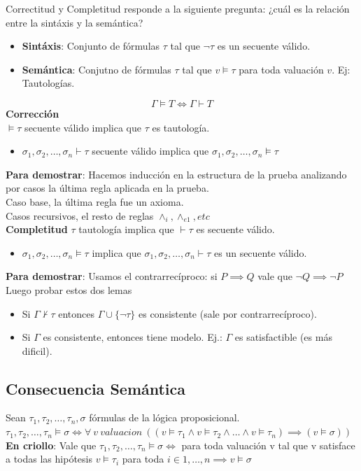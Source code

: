 \documentclass[10pt,a4paper]{article}
\begin{document}
Correctitud y Completitud responde a la siguiente pregunta: ¿cuál es la relación entre la sintáxis y la semántica?
\begin{itemize}
    \item \textbf{Sintáxis}: Conjunto de fórmulas $\tau$ tal que $\neg \tau$ es un secuente válido. 
    \item \textbf{Semántica}: Conjutno de fórmulas $\tau$ tal que $v \vDash \tau$ para toda valuación $v$. Ej: Tautologías.
\end{itemize}
\[\Gamma \vDash T \iff \Gamma \vdash T\]
\textbf{Corrección} \\
$\vDash \tau$ secuente válido implica que $\tau$ es tautología.
\begin{itemize}
    \item $\sigma_{1}, \sigma_{2}, \dots, \sigma_{n} \vdash \tau$ secuente válido implica que $\sigma_{1}, \sigma_{2}, \dots, \sigma_{n} \vDash \tau$
\end{itemize}
\textbf{Para demostrar}: Hacemos inducción en la estructura de la prueba analizando por casos la última regla aplicada en la prueba. \\
Caso base, la última regla fue un axioma. \\
Casos recursivos, el resto de reglas $\land_{i}, \land_{e1}, etc$ \\
\textbf{Completitud}
$\tau$ tautología implica que $\vdash \tau$ es secuente válido. 
\begin{itemize}
    \item $\sigma_{1}, \sigma_{2}, \dots, \sigma_{n} \vDash \tau$ implica que $\sigma_{1}, \sigma_{2}, \dots, \sigma_{n} \vdash \tau$ es un secuente válido. 
\end{itemize}
\textbf{Para demostrar}: Usamos el contrarrecíproco: si $P \implies Q$ vale que $\neg Q \implies \neg P$ \\
Luego probar estos dos lemas
\begin{itemize}
    \item Si $\Gamma \nvdash \tau$ entonces $\Gamma \cup \{\neg \tau\}$ es consistente (sale por contrarrecíproco).
    \item Si $\Gamma$ es consistente, entonces tiene modelo. Ej.: $\Gamma$ es satisfactible (es más dificil).
\end{itemize}
\subsection*{Consecuencia Semántica}
Sean $\tau_{1}, \tau_{2}, \dots, \tau_{n}, \sigma$ fórmulas de la lógica proposicional. \\
$\tau_{1}, \tau_{2}, \dots, \tau_{n} \vDash \sigma \iff \forall \ v \ valuacion \ ((v \vDash \tau_{1} \land v \vDash \tau_{2} \land \dots \land v \vDash \tau_{n}) \implies (v \vDash \sigma))$ \\
\textbf{En criollo}: Vale que $\tau_{1}, \tau_{2}, \dots, \tau_{n} \vDash \sigma \iff$ para toda valuación v tal que v satisface a todas las hipótesis $v \vDash \tau_{i}$ para toda $i \in 1, \dots, n \implies v \vDash \sigma$ 
\end{document}
